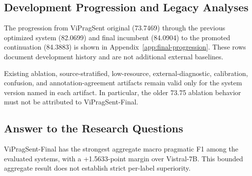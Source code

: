 \subsection{Development Progression and Legacy Analyses}

The progression from ViPragSent original (73.7469) through the previous optimized system (82.0699) and final incumbent (84.0904) to the promoted continuation (84.3883) is shown in Appendix~\ref{app:final-progression}.  These rows document development history and are not additional external baselines.

Existing ablation, source-stratified, low-resource, external-diagnostic, calibration, confusion, and annotation-agreement artifacts remain valid only for the system version named in each artifact.  In particular, the older 73.75 ablation behavior must not be attributed to ViPragSent-Final.

\subsection{Answer to the Research Questions}

ViPragSent-Final has the strongest aggregate macro pragmatic F1 among the evaluated systems, with a +1.5633-point margin over Vistral-7B.  This bounded aggregate result does not establish strict per-label superiority.
